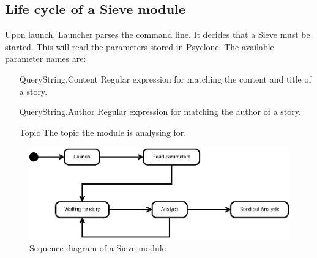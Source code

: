\subsection{Life cycle of a Sieve module}

Upon launch, Launcher parses the command line. It decides that a Sieve must
be started. This will read the parameters stored in Psyclone. The available parameter names are:

\begin{itemize}
 \item[QueryString.Content] Regular expression for matching the content and title of a story.
 \item[QueryString.Author] Regular expression for matching the author of a story.
 \item[Topic] The topic the module is analysing for.
\end{itemize}

\begin{figure}[htp]
  \centering
  \includegraphics{image/sequence-diagram-sieve}
  \caption{Sequence diagram of a Sieve module}
\end{figure}
